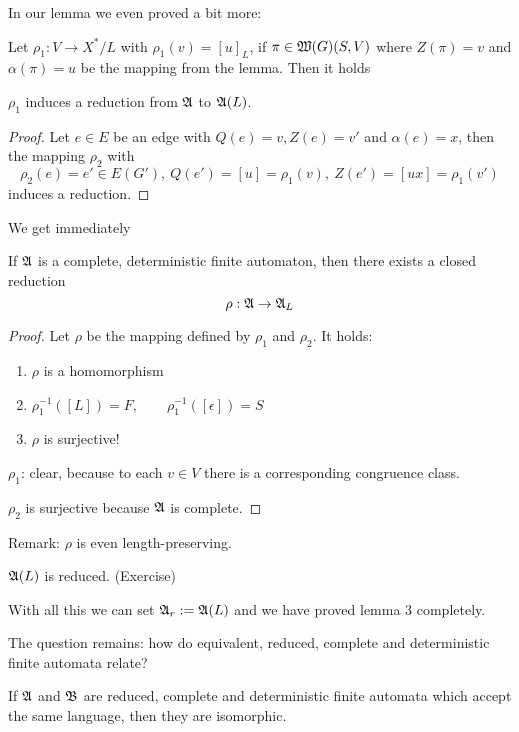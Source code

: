 In our lemma we even proved a bit more:

Let $\rho_1 : V \to X^*/L$ with $\rho_1(v) = [u]_L$, if $\pi \in
\mbox{$\mathfrak{W}(G)$}(S, V)$ where $Z(\pi) = v$ and $\alpha(\pi) = u$ be the mapping from
the lemma. Then it holds

\begin{lemma}
$\rho_1$ induces a reduction from $\mbox{$\mathfrak{A}$}$ to $\mbox{$\mathfrak{A}$}(L)$.
\end{lemma}

\begin{proof}
Let $e \in E$ be an edge with $Q(e) = v, Z(e) = v'$ and $\alpha(e) = x$, then
the mapping $\rho_2$ with \[ \rho_2(e) = e' \in E(G'),\ Q(e') = [u] =
\rho_1(v),\ Z(e') = [ux] = \rho_1(v') \]
induces a reduction.
\end{proof}

We get immediately

\begin{theorem}If $\mbox{$\mathfrak{A}$}$ is a complete, deterministic finite automaton, then
there exists a closed reduction \[ \rho : \mbox{$\mathfrak{A}$} \to \mbox{$\mathfrak{A}$}_L \]
\end{theorem}

\begin{proof}
Let $\rho$ be the mapping defined by $\rho_1$ and $\rho_2$. It holds:
\begin{enumerate}
  \item $\rho$ is a homomorphism
  \item $\rho_1^{-1}([L]) = F,\qquad \rho_1^{-1}([\epsilon]) = S$
  \item $\rho$ is surjective!
\end{enumerate}

$\rho_1$: clear, because to each $v \in V$ there is a corresponding congruence
class.

$\rho_2$ is surjective because $\mbox{$\mathfrak{A}$}$ is complete.
\end{proof}

Remark: $\rho$ is even length-preserving.

\begin{corollary}
$\mbox{$\mathfrak{A}$}(L)$ is reduced. (Exercise)
\end{corollary}

With all this we can set $\mbox{$\mathfrak{A}$}_r := \mbox{$\mathfrak{A}$}(L)$ and we have proved lemma 3
completely.

The question remains: how do equivalent, reduced, complete and deterministic
finite automata relate?

\begin{theorem}
If $\mbox{$\mathfrak{A}$}$ and $\mbox{$\mathfrak{B}$}$ are reduced, complete and deterministic finite
automata which accept the same language, then they are isomorphic.
\end{theorem}

